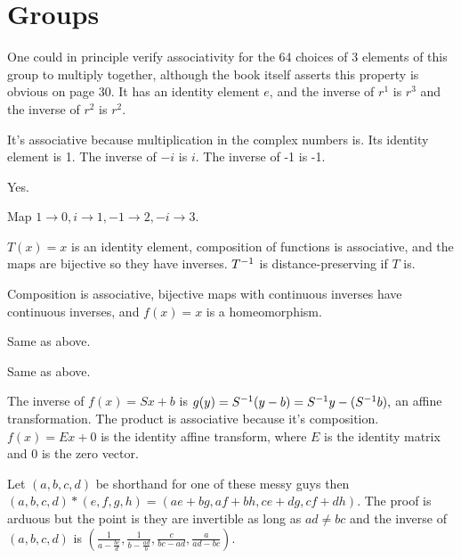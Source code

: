 \documentclass[11pt, oneside]{article}   	%
\begin{document}
\section{Groups}
\be
\item One could in principle verify associativity for the 64 choices of 3 elements of this group to multiply together, although the book itself asserts this property is obvious on page 30. It has an identity element $e$, and the inverse of $r^1$ is $r^3$ and the inverse of $r^2$ is $r^2$.
\item It's associative because multiplication in the complex numbers is. Its identity element is 1. The inverse of $-i$ is $i$. The inverse of -1 is -1.
\item Yes.
\item Map $1 \rightarrow 0, i \rightarrow 1, -1 \rightarrow 2, -i \rightarrow 3$. 
\item $T(x) = x$ is an identity element, composition of functions is associative, and the maps are bijective so they have inverses. $T^{-1}$ is distance-preserving if $T$ is.
\item Composition is associative, bijective maps with continuous inverses have continuous inverses, and $f(x) = x$ is a homeomorphism.
\item Same as above.
\item Same as above.
\item The inverse of $f(x) = Sx + b$ is $g(y) = S^{-1}(y - b) = S^{-1} y - (S^{-1} b),$ an affine transformation. The product is associative because it's composition. $f(x) = Ex + 0$ is the identity affine transform, where $E$ is the identity matrix and 0 is the zero vector.
\item Let $(a, b, c, d)$ be shorthand for one of these messy guys then $(a, b, c, d) * (e, f, g, h) = (ae + bg, af + bh, ce + dg, cf + dh)$. The proof is arduous but the point is they are invertible as long as $ad \not = bc$ and the inverse of $(a, b, c, d)$ is $(\frac{1}{a - \frac{bc}{d}}, \frac{1}{b - \frac{ad}{b}}, \frac{c}{bc - ad}, \frac{a}{ad - bc})$.
\ee
\end{document}
